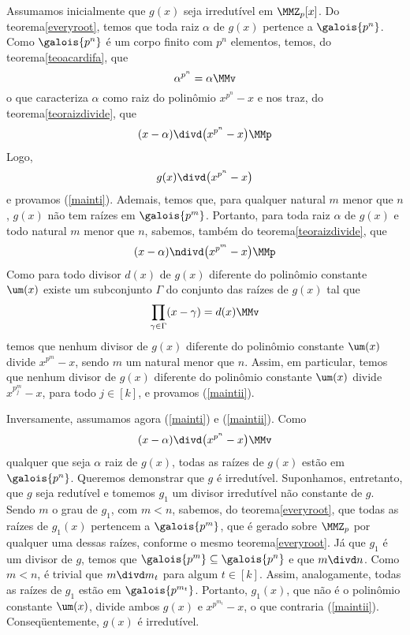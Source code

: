 \begin{prova}
  Assumamos inicialmente que $g(x)$ seja irredutível em $\MMZ_p[x]$.
  Do
  teorema\xspace\ref{everyroot}, temos que toda raiz $\alpha$ de $g(x)$
  pertence a
  $\galois{p^n}$. Como $\galois{p^n}$ é um corpo finito com $p^n$
  elementos, temos, do teorema\xspace\ref{teoacardifa}, que
  \begin{equation*}
    \alpha^{p^n} = \alpha\MMv
  \end{equation*}
  o que caracteriza $\alpha$ como raiz do polinômio $x^{p^n}-x$ e
  nos traz, do teorema\xspace\ref{teoraizdivide}, que
  \begin{equation*}
    (x-\alpha)\divd \bigl(x^{p^n}-x\bigr)\MMp
  \end{equation*}
  Logo,
  \begin{equation*}
    g(x)\divd \bigl(x^{p^n} -x\bigr)
  \end{equation*}
  e provamos (\ref{mainti}). Ademais, temos que,
  para qualquer natural $m$
  menor que $n$, $g(x)$ não tem raízes em $\galois{p^m}$. Portanto, para
  toda raiz $\alpha$ de $g(x)$ e todo natural $m$ menor que $n$,
  sabemos,
  também do teorema\xspace\ref{teoraizdivide},
  que
  \begin{equation*}
    (x-\alpha)\ndivd \bigl(x^{p^m}-x\bigr)\MMp
  \end{equation*}
  Como para todo divisor $d(x)$ de $g(x)$ diferente do polinômio
  constante
  $\um(x)$
  existe um subconjunto $\Gamma$ do conjunto das raízes de $g(x)$
  tal que
  \begin{equation*}
    \prod_{\gamma\in\Gamma}(x-\gamma) = d(x)\MMv
  \end{equation*}
  temos que nenhum divisor de $g(x)$ diferente do polinômio constante
  $\um(x)$
  divide $x^{p^m}-x$, sendo $m$ um natural menor que $n$. Assim, em
  particular, temos que nenhum divisor de $g(x)$ diferente do polinômio
  constante $\um(x)$ divide $x^{p^m_j}-x$, para todo $j\in[k]$, e
  provamos (\ref{maintii}).

  Inversamente, assumamos agora (\ref{mainti}) e (\ref{maintii}). Como
  \begin{equation*}
    (x-\alpha)\divd \bigl(x^{p^n}-x\bigr)\MMv
  \end{equation*}
  qualquer que seja $\alpha$ raiz de $g(x)$, todas as raízes de $g(x)$
  estão em $\galois{p^n}$. Queremos demonstrar que $g$ é
  irredutível. Suponhamos, entretanto, que $g$ seja redutível e tomemos
  $g_1$ um divisor irredutível não constante
  de $g$. Sendo $m$ o grau de $g_1$, com
  $m<n$, sabemos, do teorema\xspace\ref{everyroot},
  que todas as raízes de $g_1(x)$ pertencem a $\galois{p^m}$, que é
  gerado sobre $\MMZ_p$ por qualquer uma dessas raízes,
  conforme o mesmo teorema\xspace\ref{everyroot}.
  Já que $g_1$ é um divisor de $g$, temos que $\galois{p^m}\subseteq
  \galois{p^n}$ e que $m\divd n$. Como $m<n$, é trivial que $m\divd
  m_t$ para algum $t\in [k]$. Assim, analogamente, todas as
  raízes de $g_1$ estão em $\galois{p^{m_t}}$. Portanto, $g_1(x)$,
  que não é o polinômio constante $\um(x)$,
  divide ambos $g(x)$ e $x^{p^{m_t}}-x$,
  o que contraria
  (\ref{maintii}). Conseqüentemente, $g(x)$ é irredutível.
\end{prova}



